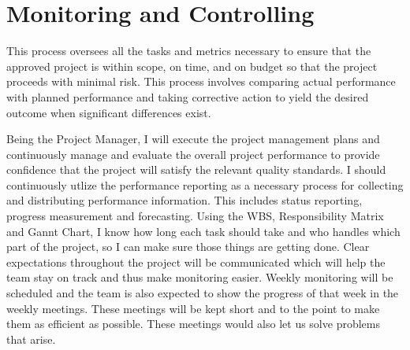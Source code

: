  \chapter*{Monitoring and Controlling}

\noindent This process oversees all the tasks and metrics necessary to ensure that the approved project is within scope, on time, and on budget so that the project proceeds with minimal risk. This process involves comparing actual performance with planned performance and taking corrective action to yield the desired outcome when significant differences exist. 

\noindent Being the Project Manager, I will execute the project management plans and continuously manage and evaluate the overall project performance to provide confidence that the project will satisfy the relevant quality standards. I should continuously utlize the performance reporting as a necessary process for collecting and distributing performance information. This includes status reporting, progress measurement and forecasting. Using the WBS, Responsibility Matrix and Gannt Chart, I know how long each task should take and who handles which part of the project, so I can make sure those things are getting done. Clear expectations throughout the project will be communicated which will help the team stay on track and thus make monitoring easier. Weekly monitoring will be scheduled and the team is also expected to show the progress of that week in the weekly meetings. These meetings will be kept short and to the point to make them as efficient as possible. These meetings would also let us solve problems that arise.




